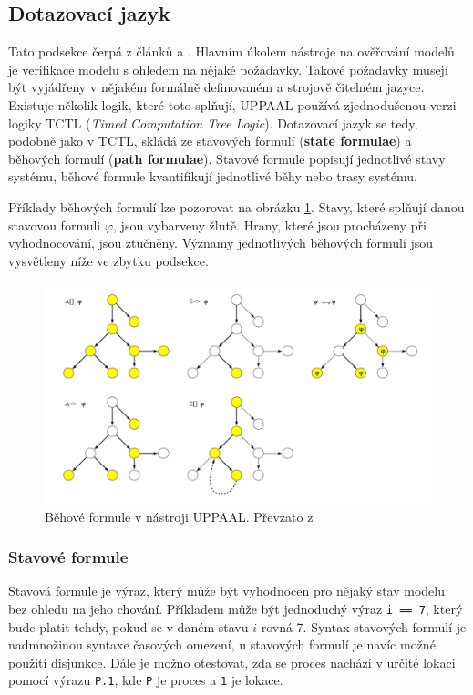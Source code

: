 \subsection{Dotazovací jazyk} \label{uppaal_query_lang}
Tato podsekce čerpá z článků \cite{uppaal_intro} a \cite{uppaal_smc}. Hlavním úkolem nástroje na ověřování modelů je verifikace modelu s ohledem na nějaké požadavky. Takové požadavky musejí být vyjádřeny v nějakém formálně definovaném a strojově čitelném jazyce. Existuje několik logik, které toto splňují, UPPAAL používá zjednodušenou verzi logiky TCTL (\textit{Timed Computation Tree Logic}). Dotazovací jazyk se tedy, podobně jako v TCTL, skládá ze stavových formulí (\textbf{state formulae}) a běhových formulí (\textbf{path formulae}). Stavové formule popisují jednotlivé stavy systému, běhové formule kvantifikují jednotlivé běhy nebo trasy systému.

Příklady běhových formulí lze pozorovat na obrázku \ref{fig:uppaal_path_form}. Stavy, které splňují danou stavovou formuli $\varphi$, jsou vybarveny žlutě. Hrany, které jsou procházeny při vyhodnocování, jsou ztučněny. Významy jednotlivých běhových formulí jsou vysvětleny níže ve zbytku podsekce.

\begin{figure}[H]
    \centering
    \includegraphics[width=\textwidth]{obrazky-figures/uppaal_path_form.png}
    \caption{Běhové formule v nástroji UPPAAL. Převzato z \cite{uppaal_intro}}
    \label{fig:uppaal_path_form}
\end{figure}

\subsubsection{Stavové formule}
Stavová formule je výraz, který může být vyhodnocen pro nějaký stav modelu bez ohledu na jeho chování. Příkladem může být jednoduchý výraz \texttt{i == 7}, který bude platit tehdy, pokud se v daném stavu $i$ rovná 7. Syntax stavových formulí je nadmnožinou syntaxe časových omezení, u stavových formulí je navíc možné použití disjunkce. Dále je možno otestovat, zda se proces nachází v určité lokaci pomocí výrazu \texttt{P.1}, kde \texttt{P} je proces a \texttt{1} je lokace.

